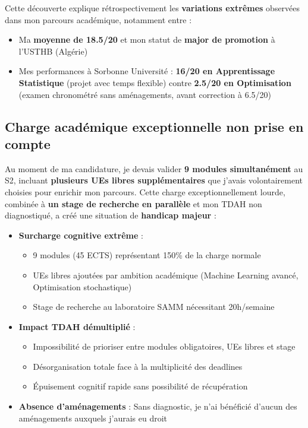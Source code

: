 \documentclass[12pt,french,a4paper]{article}
\begin{document}
Cette découverte explique rétrospectivement les \textbf{variations extrêmes} observées dans mon parcours académique, notamment entre :
\begin{itemize}
\item Ma \textbf{moyenne de 18.5/20} et mon statut de \textbf{major de promotion} à l'USTHB (Algérie)
\item Mes performances à Sorbonne Université : \textbf{16/20 en Apprentissage Statistique} (projet avec temps flexible) contre \textbf{2.5/20 en Optimisation} (examen chronométré sans aménagements, avant correction à 6.5/20)
\end{itemize}

\subsection{Charge académique exceptionnelle non prise en compte}

Au moment de ma candidature, je devais valider \textbf{9 modules simultanément} au S2, incluant \textbf{plusieurs UEs libres supplémentaires} que j'avais volontairement choisies pour enrichir mon parcours. Cette charge exceptionnellement lourde, combinée à \textbf{un stage de recherche en parallèle} et mon TDAH non diagnostiqué, a créé une situation de \textbf{handicap majeur} :

\begin{itemize}
\item \textbf{Surcharge cognitive extrême} :
  \begin{itemize}
  \item 9 modules (45 ECTS) représentant 150\% de la charge normale
  \item UEs libres ajoutées par ambition académique (Machine Learning avancé, Optimisation stochastique)
  \item Stage de recherche au laboratoire SAMM nécessitant 20h/semaine
  \end{itemize}
\item \textbf{Impact TDAH démultiplié} :
  \begin{itemize}
  \item Impossibilité de prioriser entre modules obligatoires, UEs libres et stage
  \item Désorganisation totale face à la multiplicité des deadlines
  \item Épuisement cognitif rapide sans possibilité de récupération
  \end{itemize}
\item \textbf{Absence d'aménagements} : Sans diagnostic, je n'ai bénéficié d'aucun des aménagements auxquels j'aurais eu droit
\end{itemize}
\end{document}
